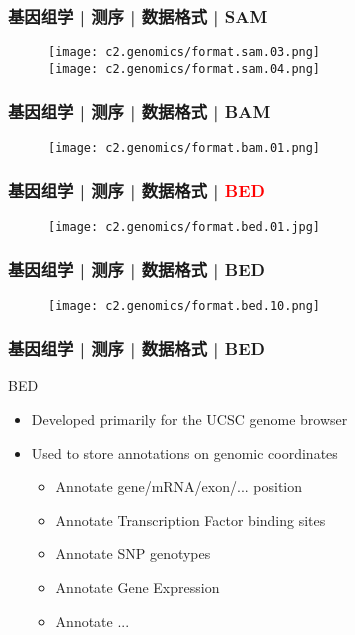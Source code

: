 \begin{frame}
  \frametitle{基因组学 | 测序 | 数据格式 | SAM}
  \begin{figure}
    \centering
    \texttt{[image: c2.genomics/format.sam.03.png]}\\
    \vspace{1em}
    \texttt{[image: c2.genomics/format.sam.04.png]}
  \end{figure}
\end{frame}
    
\begin{frame}
  \frametitle{基因组学 | 测序 | 数据格式 | BAM}
  \begin{figure}
    \centering
    \texttt{[image: c2.genomics/format.bam.01.png]}
  \end{figure}
\end{frame}
    
\begin{frame}
  \frametitle{基因组学 | 测序 | 数据格式 | \textcolor{red}{BED}}
  \begin{figure}
    \centering
    \texttt{[image: c2.genomics/format.bed.01.jpg]}
  \end{figure}
\end{frame}

\begin{frame}
  \frametitle{基因组学 | 测序 | 数据格式 | BED}
  \begin{figure}
    \centering
    \texttt{[image: c2.genomics/format.bed.10.png]}
  \end{figure}
\end{frame}

\begin{frame}
  \frametitle{基因组学 | 测序 | 数据格式 | BED}
  \begin{block}{BED}
    \begin{itemize}
      \item Developed primarily for the UCSC genome browser
      \item Used to store annotations on genomic coordinates
        \begin{itemize}
          \item Annotate gene/mRNA/exon/... position
          \item Annotate Transcription Factor binding sites
          \item Annotate SNP genotypes
          \item Annotate Gene Expression
          \item Annotate ...
        \end{itemize}
    \end{itemize}
  \end{block}
\end{frame}
    
